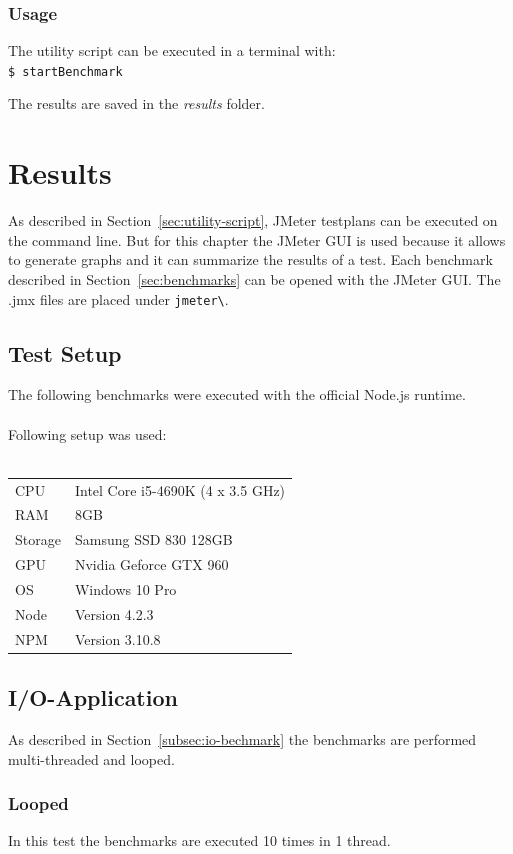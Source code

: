 	\subsection{Usage}
	The utility script can be executed in a terminal with: \\
	\texttt{\$ startBenchmark}
	
	The results are saved in the \textit{results} folder.
\chapter{Results}
\label{ch:results}
As described in Section~\ref{sec:utility-script}, JMeter testplans can be executed on the command line. But for this chapter the JMeter GUI is used because it allows to generate graphs and it can summarize the results of a test. Each benchmark described in Section~\ref{sec:benchmarks} can be opened with the JMeter GUI. The .jmx files are placed under \texttt{jmeter\textbackslash <application-name>}.

\section{Test Setup}
The following benchmarks were executed with the official Node.js runtime.\\ \\
Following setup was used:\\ \\
\begin{tabular}{ll}
	CPU & Intel Core i5-4690K (4 x 3.5 GHz) \\
	RAM & 8GB \\
	Storage & Samsung SSD 830 128GB \\
	GPU & Nvidia Geforce GTX 960 \\
	OS & Windows 10 Pro \\
	Node & Version 4.2.3 \\
	NPM & Version 3.10.8 \\
\end{tabular}
\section{I/O-Application}
As described in Section~\ref{subsec:io-bechmark} the benchmarks are performed multi-threaded and looped.

\subsection{Looped}
In this test the benchmarks are executed 10 times in 1 thread. \\

